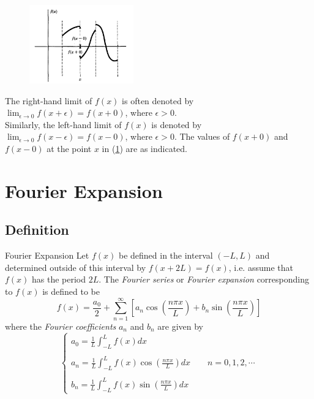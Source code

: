 \documentclass[12pt]{article}
\numberwithin{equation}{subsection}
\begin{document}
\renewcommand{\thefigure}{1.2.1}
\begin{figure}[htpb]
    \centering
    \includegraphics[width=0.4\textwidth]{./images/1.2.1}
    \caption{}
    \label{fig:1.2.1}
\end{figure}

The right-hand limit of $f(x)$ is often denoted by $\lim_{\epsilon \to 0} f(x+\epsilon) = f(x+0)$, where $\epsilon > 0$.\\
Similarly, the left-hand limit of $f(x)$ is denoted by $\lim_{\epsilon \to 0} f(x-\epsilon) = f(x-0)$, where $\epsilon > 0$. The values of $f(x+0)$ and $f(x-0)$ at the point $x$ in (\ref{fig:1.2.1}) are as indicated.


\section{Fourier Expansion}

\subsection{Definition}
\begin{definition}{Fourier Expansion}{}
    Let $f(x)$ be defined in the interval $(-L,L)$ and determined outside of this interval by $f(x+2L)=f(x)$, i.e. assume that $f(x)$ has the period $2L$. The \textit{Fourier series} or \textit{Fourier expansion} corresponding to $f(x)$ is defined to be
    \begin{equation}
        f(x) = \frac{a_0}{2} + \sum_{n=1}^{\infty} \left[ a_n \cos \left( \frac{n\pi x}{L} \right) + b_n \sin \left( \frac{n\pi x}{L} \right) \right]
    \end{equation}
    where the \textit{Fourier coefficients} $a_n$ and $b_n$ are given by
    \begin{equation}
        \begin{cases}
            \displaystyle 
            a_0 = \frac{1}{L} \int_{-L}^{L} f(x) dx \\\\
            \displaystyle 
            a_n = \frac{1}{L} \int_{-L}^{L} f(x) \cos \left( \frac{n\pi x}{L} \right) dx \qquad n = 0, 1, 2, \cdots \\\\
            \displaystyle 
            b_n = \frac{1}{L} \int_{-L}^{L} f(x) \sin \left( \frac{n\pi x}{L} \right) dx
        \end{cases}
    \end{equation}
\end{definition}
\end{document}
